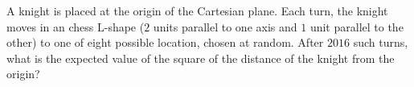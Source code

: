 A knight is placed at the origin of the Cartesian plane. Each turn, the knight moves in an chess $\text{L}$-shape ($2$ units parallel to one axis and $1$ unit parallel to the other) to one of eight possible location, chosen at random. After $2016$ such turns, what is the expected value of the square of the distance of the knight from the origin?
